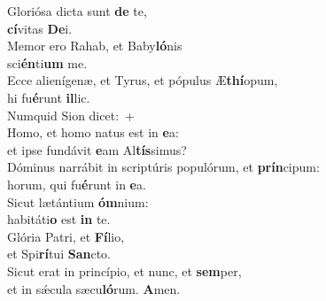 \evenverse Gloriósa dicta sunt \textbf{de} te,~\*\\
\evenverse \textbf{cí}vitas \textbf{De}i.\\
\oddverse Memor ero Rahab, et Baby\textbf{ló}nis~\*\\
\oddverse sci\textbf{én}ti\textbf{um} me.\\
\evenverse Ecce alienígenæ, et Tyrus, et pópulus Æ\textbf{thí}opum,~\*\\
\evenverse hi fu\textbf{é}runt \textbf{il}lic.\\
\oddverse Numquid Sion dicet:~+\\
\oddverse  Homo, et homo natus est in \textbf{e}a:~\*\\
\oddverse et ipse fundávit \textbf{e}am Al\textbf{tís}simus?\\
\evenverse Dóminus narrábit in scriptúris populórum, et \textbf{prín}cipum:~\*\\
\evenverse horum, qui fu\textbf{é}runt in \textbf{e}a.\\
\oddverse Sicut lætántium \textbf{óm}nium:~\*\\
\oddverse habitáti\textbf{o} est \textbf{in} te.\\
\evenverse Glória Patri, et \textbf{Fí}lio,~\*\\
\evenverse et Spi\textbf{rí}tui \textbf{San}cto.\\
\oddverse Sicut erat in princípio, et nunc, et \textbf{sem}per,~\*\\
\oddverse et in sǽcula sæcu\textbf{ló}rum. \textbf{A}men.\\
